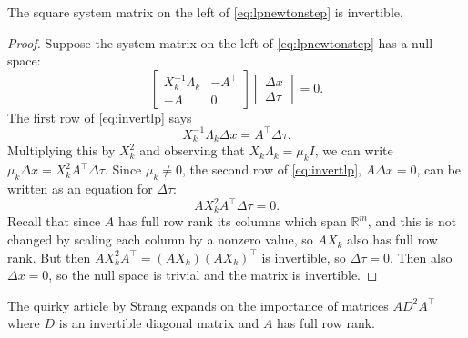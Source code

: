 \documentclass[11pt]{article}
\newcommand{\RR}{\mathbb{R}}
\begin{document}
\begin{lemma}
The square system matrix on the left of \eqref{eq:lpnewtonstep} is invertible.
\end{lemma}

\begin{proof}  Suppose the system matrix on the left of \eqref{eq:lpnewtonstep} has a null space:
\begin{equation}
\begin{bmatrix}
X_k^{-1}\Lambda_k  & -A^\top \\
-A                 & 0
\end{bmatrix}
\begin{bmatrix}
\Delta x \\
\Delta \tau
\end{bmatrix}
= 0. \label{eq:invertlp}
\end{equation}
The first row of \eqref{eq:invertlp} says
    $$X_k^{-1}\Lambda_k \Delta x = A^\top \Delta\tau.$$
Multiplying this by $X_k^2$ and observing that $X_k\Lambda_k = \mu_k I$, we can write $\mu_k\Delta x = X_k^2 A^\top \Delta \tau$.  Since $\mu_k\ne 0$, the second row of \eqref{eq:invertlp}, $A\Delta x=0$, can be written as an equation for $\Delta\tau$:
    $$A X_k^2 A^\top \Delta \tau = 0.$$
Recall that since $A$ has full row rank its columns which span $\RR^m$, and this is not changed by scaling each column by a nonzero value, so $AX_k$ also has full row rank.  But then $A X_k^2 A^\top = (AX_k) (AX_k)^\top$ is invertible, so $\Delta \tau=0$.  Then also $\Delta x=0$, so the null space is trivial and the matrix is invertible.\end{proof}

The quirky article by Strang \cite{Strang1987} expands on the importance of matrices $A D^2 A^\top$ where $D$ is an invertible diagonal matrix and $A$ has full row rank.
\end{document}
